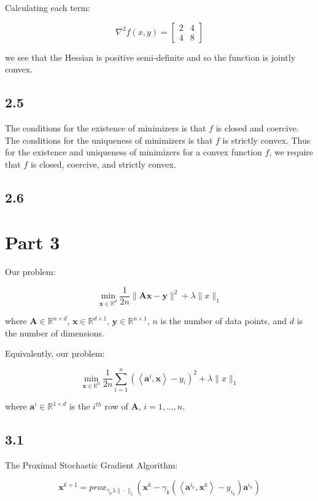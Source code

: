 \documentclass[12pt]{article}
\begin{document}
Calculating each term:

\[\nabla^2 f(x, y) = \begin{bmatrix}
                 2 & 4\\
                 4 & 8
         \end{bmatrix}
\]

we see that the Hessian is positive semi-definite and so the function is jointly convex.

\subsection*{2.5}
  The conditions for the existence of minimizers is that $f$ is closed and coercive.
  The conditions for the uniqueness of minimizers is that $f$ is strictly convex.
Thus for the existence and uniqueness of minimizers for a convex function $f$, we require that $f$ is closed, coercive, and strictly convex.

\subsection*{2.6}

\newpage
\section*{Part 3}

Our problem:

\[\min_{\textbf{x} \in \mathbb{R}^d} \frac{1}{2n} \|\textbf{Ax}-\textbf{y}\|^2 + \lambda \|x\|_1\]

where $\textbf{A} \in \mathbb{R}^{n\times d}$, $\textbf{x} \in \mathbb{R}^{d \times 1}$, $\textbf{y} \in \mathbb{R}^{n \times 1}$, $n$ is the number of data points, and $d$ is the number of dimensions.

Equivalently, our problem:

\[\min_{\textbf{x} \in \mathbb{R}^d} \frac{1}{2n} \sum_{i=1}^n \left(\left\langle \textbf{a}^i, \textbf{x} \right\rangle - y_i \right)^2 + \lambda \|x\|_1\]

where $\textbf{a}^i \in \mathbb{R}^{1 \times d}$ is the $i^{th}$ row of \textbf{A}, $i=1, ..., n$.

\subsection*{3.1}
The Proximal Stochastic Gradient Algorithm:

\[\textbf{x}^{k+1} = prox_{\gamma_k \lambda \|\cdot\|_1} \left(\textbf{x}^k - \gamma_k \left(\left\langle \textbf{a}^{i_k}, \textbf{x}^{k}\right\rangle - y_{i_k}\right)\textbf{a}^{i_k}\right)\]
\end{document}
